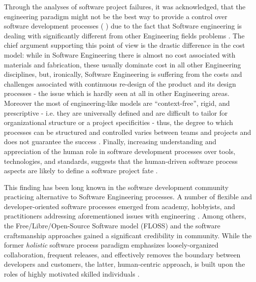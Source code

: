 Through the analyses of software project failures, it was acknowledged, that the engineering 
paradigm might not be the best way to provide a control over software development processes 
(\cite{citeulike:3729379} \cite{citeulike:5203446}) due to the fact that Software engineering 
is dealing with significantly different from other Engineering fields problems \cite{citeulike:2207657} .
The chief argument supporting this point of view is the drastic difference in the cost model:
while in Software Engineering there is almost no cost associated with materials and 
fabrication, these usually dominate cost in all other Engineering disciplines, but, 
ironically, Software Engineering is suffering from the costs and challenges associated with 
continuous re-design of the product and its design processes - the issue which is 
hardly seen at all in other Engineering areas. 
Moreover the most of engineering-like models are ``context-free'', rigid, and prescriptive - 
i.e. they are universally defined and are difficult to tailor for organizational structure or 
a project specificities  - thus, the degree to which processes can be structured 
and controlled varies between teams and projects and does not guarantee the success \cite{sacchi_2001}.
Finally, increasing understanding and appreciation of the human role in software development 
processes over tools, technologies, and standards, suggests that the human-driven software process 
aspects are likely to define a software project fate \cite{citeulike:6580825} \cite{citeulike:149387} 
\cite{1605185} \cite{citeulike:113403} \cite{citeulike:12743107}. 

This finding has been long known in the software development community practicing alternative to Software 
Engineering processes. A number of flexible and developer-oriented software processes emerged from academy,
hobbyists, and practitioners addressing aforementioned issues with engineering \cite{citeulike:3729379}. 
Among others, the Free/Libre/Open-Source Software model (FLOSS) and the software craftsmanship  
approaches gained a significant credibility in community. 
While the former \textit{holistic} software process paradigm emphasizes loosely-organized 
collaboration, frequent releases, and effectively removes the boundary between developers 
and customers, the latter, human-centric approach, is built upon the roles of highly 
motivated skilled individuals \cite{citeulike:262020} \cite{citeulike:2759198}. 


